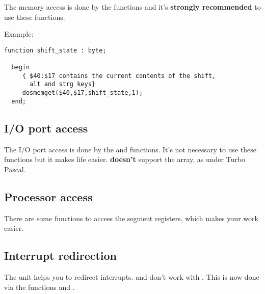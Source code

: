 The \dos memory access is done by the 
functions and it's \textbf {strongly recommended } to use these functions. 

Example:
\begin{verbatim} 
function shift_state : byte;
  
  begin
     { $40:$17 contains the current contents of the shift, 
       alt and strg keys} 
     dosmemget($40,$17,shift_state,1);
  end;
\end{verbatim}
\subsection{I/O port access}

The I/O port access is done by the  and  functions. 
It's not necessary to use these functions but it makes life easier. \fpk 
\textbf {doesn't} support the  array, as under Turbo Pascal. 

\subsection{Processor access}
There are some functions to access the segment registers, which makes
your work easier. 

\subsection{Interrupt redirection}

The  unit helps you to redirect interrupts. 
and  don't work with \fpk. This is now done via the functions
 and .

